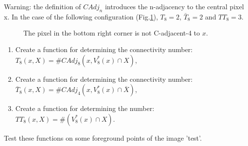 \begin{rmq}Warning: the definition of $CAdj_n$ introduces the n-adjacency to the central pixel x. In the case of the following configuration (Fig.\ref{fig:topological_description:enonce:cadj4}), $T_8=2$, $\bar{T}_8=2$ and $TT_8=3$.\end{rmq}
\vspace*{-8pt}
\begin{figure}[H]
\centering\caption{The pixel in the bottom right corner is not C-adjacent-4 to $x$.}%
\hspace{15mm}
\vspace*{-8pt}%
\label{fig:topological_description:enonce:cadj4}%
\end{figure}
\vspace*{-8pt}

\begin{qbox}
\begin{enumerate}
	\item Create a function for determining the connectivity number:\\ $T_8(x,X)=\#CAdj_8(x,V_8^* (x)\cap X)$,
	\item Create a function for determining the connectivity number:\\ $\overline{T}_8(x,X)=\#CAdj_4(x,V_8^* (x)\cap \overline{X})$,
	\item Create a function for determining the number: \\$TT_8(x,X)=\#(V_8^*(x)\cap X)$.
\end{enumerate}
Test these functions on some foreground points of the image 'test'.
\end{qbox}

